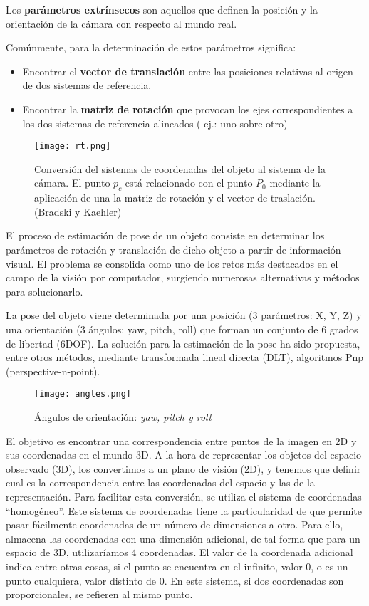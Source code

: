Los \textbf{parámetros extrínsecos} son aquellos que definen la posición y la orientación de la cámara con respecto al mundo real.

Comúnmente, para la determinación de estos parámetros significa:
\begin{itemize}
\item Encontrar el \textbf{vector de translación} entre las posiciones relativas al origen de dos sistemas de referencia.
\item Encontrar la \textbf{matriz de rotación} que provocan los ejes correspondientes a los dos sistemas de referencia alineados ( ej.: uno sobre otro)
\end{itemize}

\begin{figure}[h]
  \centering
  \texttt{[image: rt.png]}
  \caption{Conversión del sistemas de coordenadas del objeto al sistema de la cámara. El punto $p_c$
    está relacionado con el punto $P_0$ mediante la aplicación de una la matriz de rotación y el
    vector de traslación. (Bradski y Kaehler)}
  \label{fig:RT}
\end{figure}

El proceso de estimación de pose de un objeto consiste en determinar los parámetros de rotación y translación de dicho objeto a partir de información visual. El problema se consolida como uno de los retos más destacados en el campo de la visión por computador, surgiendo numerosas alternativas y métodos para solucionarlo.

La pose del objeto viene determinada por una posición (3 parámetros: X, Y, Z) y una orientación (3 ángulos: yaw, pitch, roll) que forman un conjunto de 6 grados de libertad (6DOF). La solución para la estimación de la pose ha sido propuesta, entre otros métodos, mediante transformada lineal directa (DLT), algoritmos Pnp (perspective-n-point).
\begin{figure}[h]
  \centering
  \texttt{[image: angles.png]}
  \caption{Ángulos de orientación: \emph{yaw, pitch y roll}}
  \label{fig:ángulos}
\end{figure}

El objetivo es encontrar una correspondencia entre puntos de la imagen en 2D y sus coordenadas en el mundo 3D. A la hora de representar los objetos del espacio observado (3D), los convertimos a un plano de visión (2D), y tenemos que definir cual es la correspondencia entre las coordenadas del espacio y las de la representación. Para facilitar esta conversión, se utiliza el sistema de coordenadas ``homogéneo''. Este sistema de coordenadas tiene la particularidad de que permite pasar fácilmente coordenadas de un número de dimensiones a otro. Para ello, almacena las coordenadas con una dimensión adicional, de tal forma que para un espacio de 3D, utilizaríamos 4 coordenadas. El valor de la coordenada adicional indica entre otras cosas, si el punto se encuentra en el infinito, valor 0, o es un punto cualquiera, valor distinto de 0. En este sistema, si dos coordenadas son proporcionales, se refieren al mismo punto.

